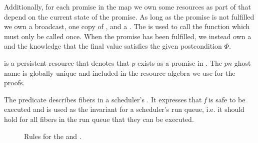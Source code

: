 Additionally, for each promise in the map we own some resources as part of \gsPInvIn{} that depend on the current state of the promise.
As long as the promise is not fulfilled we own a broadcast, one copy of \gspwait{}, and a \gssignal{}.
The \gssignal{} is used to call the  function which must only be called once.
When the promise has been fulfilled, we instead own a \gspdone{} and the knowledge that the final value satisfies the given postcondition \(Φ\).

\gsIsPr{} is a persistent resource that denotes that \(p\) exists as a promise in \gsPInvIn{}. The \(pn\) ghost name is globally unique and included in the resource algebra we use for the proofs.

The \gsReady{} predicate describes fibers in a scheduler's .
It expresses that \emph{f} is safe to be executed and is used as the invariant for a scheduler's run queue, i.e. it should hold for all fibers in the run queue that they can be executed.

\begin{figure}
  \caption{Rules for the \gspwait{} and \gspdone{}.}
  \label{fig:promise-state-rules}
\end{figure}


